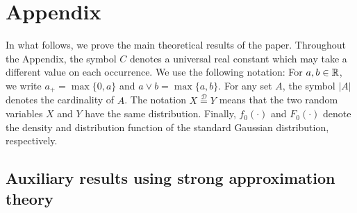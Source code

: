 \documentclass[a4paper,12pt]{article}
\numberwithin{equation}{section}
\begin{document}
\newpage
\section*{Appendix}

\def\theequation{A.\arabic{equation}}
\setcounter{equation}{0}
\allowdisplaybreaks[3]



In what follows, we prove the main theoretical results of the paper. Throughout the Appendix, the symbol $C$ denotes a universal real constant which may take a different value on each occurrence. We use the following notation: For $a,b \in \mathbb{R}$, we write $a_+ = \max \{0,a\}$ and $a \vee b = \max\{a,b\}$. For any set $A$, the symbol $|A|$ denotes the cardinality of $A$. The notation $X \stackrel{\mathcal{D}}{=} Y$ means that the two random variables $X$ and $Y$ have the same distribution. Finally, $f_0(\cdot)$ and $F_0(\cdot)$ denote the density and distribution function of the standard Gaussian distribution, respectively.



\subsection*{Auxiliary results using strong approximation theory}
\end{document}
